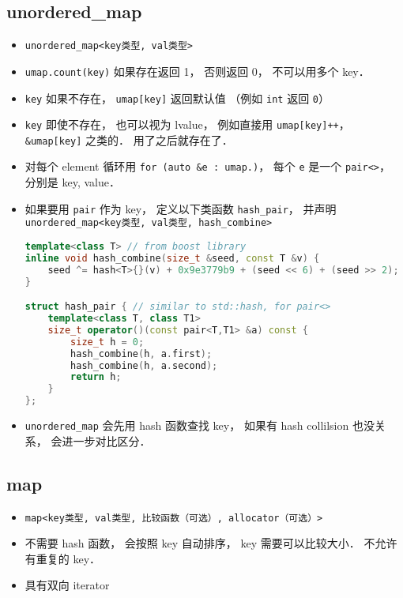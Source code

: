 \subsection{unordered\_map}
\begin{itemize}
\item \verb|unordered_map<key类型, val类型>|
\item \verb|umap.count(key)| 如果存在返回 1， 否则返回 0， 不可以用多个 key．
\item \verb|key| 如果不存在， \verb|umap[key]| 返回默认值 （例如 \verb|int| 返回 \verb|0|）
\item \verb|key| 即使不存在， 也可以视为 lvalue， 例如直接用 \verb|umap[key]++|， \verb|&umap[key]| 之类的． 用了之后就存在了．
\item 对每个 element 循环用 \verb|for (auto &e : umap.)|， 每个 \verb|e| 是一个 \verb|pair<>|， 分别是 key, value．
\item 如果要用 \verb|pair| 作为 key， 定义以下类函数 \verb|hash_pair|， 并声明 \verb|unordered_map<key类型, val类型, hash_combine>|
\begin{lstlisting}[language=cpp]
template<class T> // from boost library
inline void hash_combine(size_t &seed, const T &v) {
    seed ^= hash<T>{}(v) + 0x9e3779b9 + (seed << 6) + (seed >> 2);
}

struct hash_pair { // similar to std::hash, for pair<>
    template<class T, class T1>
    size_t operator()(const pair<T,T1> &a) const {
        size_t h = 0;
        hash_combine(h, a.first);
        hash_combine(h, a.second);
        return h;
    }
};
\end{lstlisting}
\item \verb|unordered_map| 会先用 hash 函数查找 key， 如果有 hash collilsion 也没关系， 会进一步对比区分．
\end{itemize}

\subsection{map}
\begin{itemize}
\item \verb|map<key类型, val类型, 比较函数（可选）, allocator（可选）>|
\item 不需要 hash 函数， 会按照 key 自动排序， key 需要可以比较大小． 不允许有重复的 key．
\item 具有双向 iterator
\end{itemize}

